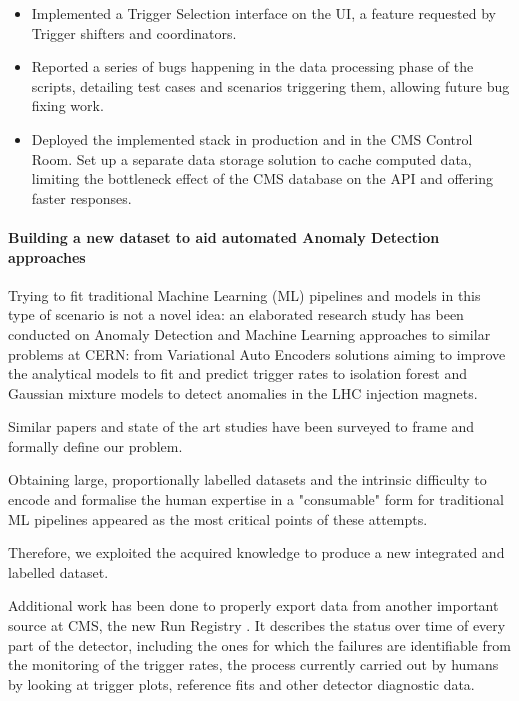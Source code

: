 \documentclass[a4, oneside, 11pt, nobib]{memoir}
\begin{document}
\begin{itemize}
		\item Implemented a Trigger Selection interface on the UI, a feature requested by Trigger shifters and coordinators.
		\item Reported a series of bugs happening in the data processing phase of the scripts, detailing test cases and  scenarios triggering them, allowing future bug fixing work.
		\item Deployed the implemented stack in production and in the CMS Control Room. Set up a separate data storage solution to cache computed data, limiting the bottleneck effect of the CMS database on the API and offering faster responses.

		\end{itemize}


		\paragraph{Building a new dataset to aid automated Anomaly Detection approaches}

		Trying to fit traditional Machine Learning (ML) pipelines and models in this type of scenario is not a novel idea: an elaborated research study has been conducted on Anomaly Detection and Machine Learning approaches to similar problems at CERN: from Variational Auto Encoders solutions \cite{adpol-cvae} aiming to improve the analytical models to fit and predict trigger rates to isolation forest and Gaussian mixture models \cite{Halilovic:2665985} to detect anomalies in the LHC injection magnets.

		Similar papers and state of the art studies have been surveyed to frame and formally define our problem.

		Obtaining large, proportionally labelled datasets and the intrinsic difficulty to encode and formalise the human expertise in a "consumable" form for traditional ML pipelines appeared as the most critical points of these attempts.

		Therefore, we exploited the acquired knowledge to produce a new integrated and labelled dataset.

		Additional work has been done to properly export data from another important source at CMS, the new Run Registry \cite{cms_collaboration_2019_3599323}. It describes the status over time of every part of the detector, including the ones for which the failures are identifiable from the monitoring of the trigger rates, the process currently carried out by humans by looking at trigger plots, reference fits and other detector diagnostic data.
\end{document}
